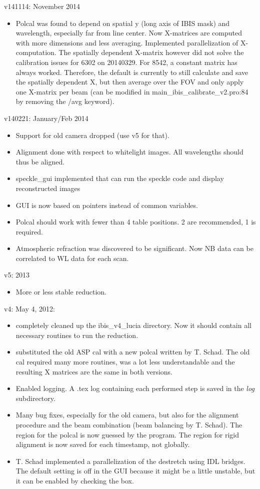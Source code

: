\documentclass[a4paper,11pt]{article}
\begin{document}
v141114: November 2014
\begin{itemize}
\item Polcal was found to depend on spatial y (long axis of IBIS mask) and wavelength, especially far from line center. Now X-matrices are computed with more dimensions and less averaging. Implemented parallelization of X-computation. The spatially dependent X-matrix however did not solve the calibration issues for 6302 on 20140329. For 8542, a constant matrix has always worked. Therefore, the default is currently to still calculate and save the spatially dependent X, but then average over the FOV and only apply one X-matrix per beam (can be modified in main\_ibis\_calibrate\_v2.pro:84 by removing the /avg keyword).
\end{itemize}


v140221: January/Feb 2014
\begin{itemize}
\item Support for old camera dropped (use v5 for that).
\item Alignment done with respect to whitelight images. All wavelengths should thus be aligned.
\item speckle\_gui implemented that can run the speckle code and display reconstructed images
\item GUI is now based on pointers instead of common variables.
\item Polcal should work with fewer than 4 table positions. 2 are
  recommended, 1 is required.
\item Atmospheric refraction was discovered to be significant. Now NB data can be correlated to WL data for each scan.
\end{itemize}



v5: 2013
\begin{itemize}
\item More or less stable reduction.
\end{itemize}



v4: May 4, 2012:
\begin{itemize}
\item completely cleaned up the ibis\_v4\_lucia directory. Now it should contain all necessary routines to run the reduction.
\item substituted the old ASP cal with a new polcal written by T. Schad. The old cal required many more routines, was a lot less understandable and the resulting X matrices are the same in both versions.
\item Enabled logging. A .tex log containing  each performed step is saved in the \textit{log} subdirectory.
\item Many bug fixes, especially for the old camera, but also for the alignment procedure and the beam combination (beam balancing by T. Schad). The region for the polcal is now guessed by the program. The region for rigid alignment is now saved for each timestamp, not globally.
\item T. Schad implemented a parallelization of the destretch using IDL bridges. The default setting is off in the GUI because it might be a little unstable, but it can be enabled by checking the box.
\end{itemize}
\end{document}
